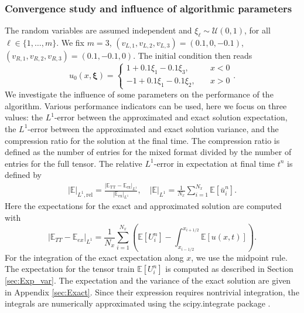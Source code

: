 \documentclass{article}
\newcommand{\bfxi}{ {\bm \xi} }
\begin{document}
\subsubsection{Convergence study and influence of algorithmic parameters}
The random variables are assumed independent and $\xi_\ell \sim \mathcal U(0,1)$, for all $\ell \in \{1,\dots,m\}$. 
We fix $m=3$, $(v_{L,1}, v_{L,2}, v_{L,3}) = (0.1, 0, -0.1)$, $(v_{R,1}, v_{R,2}, v_{R,3}) = (0.1, -0.1, 0)$. 
The initial condition then reads
\begin{equation}
    u_0(x,\bfxi) = \begin{cases}
        1 + 0.1 \xi_1 - 0.1 \xi_3,  & \quad x < 0
        \\
        - 1 + 0.1 \xi_1 - 0.1 \xi_2, & \quad x > 0
    \end{cases}
    .
\end{equation}
We investigate the influence of some parameters on the  performance of the algorithm. 
Various performance indicators can be used, here we focus on three values: the $L^1$-error between the approximated and exact solution expectation, 
the $L^1$-error between the approximated and exact solution variance, and the compression ratio for the solution at the final time.
The compression ratio is defined as the number of entries for the mixed format divided by the number of entries for the full tensor.  
The relative $L^1$-error in expectation at final time $t^n$ is defined by 
\begin{align}
    |\mathbb E|_{L^1, \text{rel}}
    = \frac{|\mathbb E_\text{TT} - \mathbb E_\text{ex}|_{L^1}}{|\mathbb E_\text{ex}|_{L^1}}, 
    \quad
    |\mathbb E|_{L^1} 
    = \frac{1}{N_x} \sum_{i=1}^{N_x} \mathbb E[\bar u_i^n].
\end{align}
Here the expectations for the exact and approximated solution are computed with
\begin{equation}
    |\mathbb E_{TT} - \mathbb E_{ex}|_{L^1}
    = \frac{1}{N_x} \sum_{i=1}^{N_x} \left( 
        \mathbb E[U_i^n] 
        - \int_{x_{i-1/2}}^{x_{i+1/2}} \mathbb E[u(x,t)]
    \right).
\end{equation}
For the integration of the exact expectation along $x$, we use the midpoint rule. 
The expectation for the tensor train $\mathbb E[U_i^n]$ is computed as described in Section \ref{sec:Exp_var}.  
The expectation and the variance of the exact solution are given in Appendix \ref{sec:Exact}. 
Since their expression requires nontrivial integration, the integrals are numerically approximated using the scipy.integrate package \cite{virtanen_scipy_2020}. 
\end{document}

